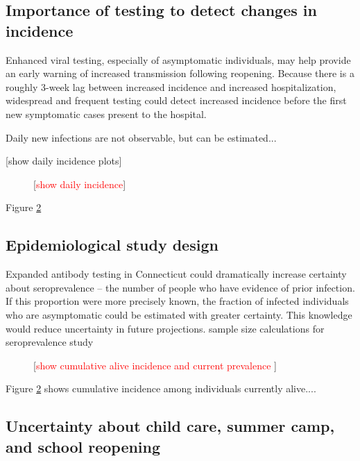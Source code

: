 \documentclass[11pt]{article}
\newcommand{\comment}[1]{[\textcolor{red}{#1}]}
\begin{document}
\subsection*{Importance of testing to detect changes in incidence}

Enhanced viral testing, especially of asymptomatic individuals, may help provide an early warning of increased transmission following reopening.  Because there is a roughly 3-week lag between increased incidence and increased hospitalization, widespread and frequent testing could detect increased incidence before the first new symptomatic cases present to the hospital. 

Daily new infections are not observable, but can be estimated...

[show daily incidence plots]


\begin{figure}
\centering
\caption{\comment{show daily incidence}}
\label{fig:cumincidence}
\end{figure}

Figure \ref{fig:cumincidence} 



\subsection*{Epidemiological study design}

Expanded antibody testing in Connecticut could dramatically increase certainty about seroprevalence -- the number of people who have evidence of prior infection. If this proportion were more precisely known, the fraction of infected individuals who are asymptomatic could be estimated with greater certainty.  This knowledge would reduce uncertainty in future projections.  
sample size calculations for seroprevalence study


\begin{figure}
\centering
\caption{\comment{show cumulative alive incidence and current prevalence }}
\label{fig:cumincidence}
\end{figure}

Figure \ref{fig:cumincidence} shows cumulative incidence among individuals currently alive....



\subsection*{Uncertainty about child care, summer camp, and school reopening}
\end{document}
